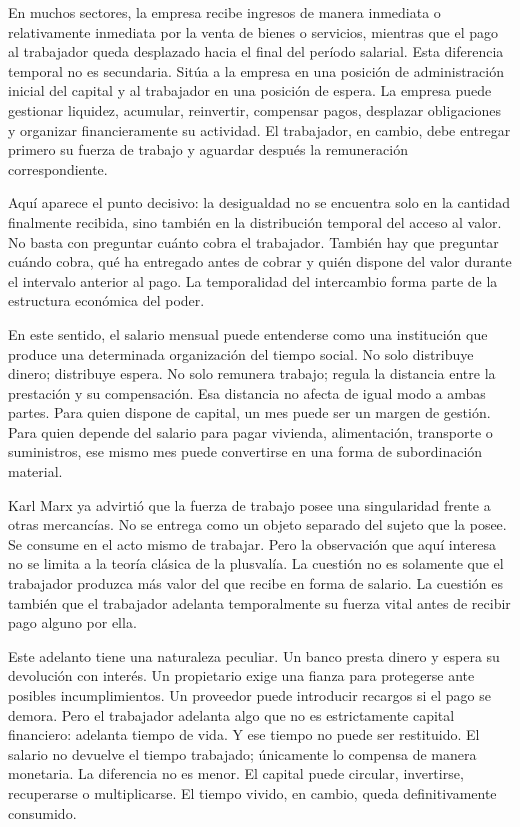 \documentclass[12pt,a4paper]{article}
\begin{document}
En muchos sectores, la empresa recibe ingresos de manera inmediata o relativamente inmediata por la venta de bienes o servicios, mientras que el pago al trabajador queda desplazado hacia el final del período salarial. Esta diferencia temporal no es secundaria. Sitúa a la empresa en una posición de administración inicial del capital y al trabajador en una posición de espera. La empresa puede gestionar liquidez, acumular, reinvertir, compensar pagos, desplazar obligaciones y organizar financieramente su actividad. El trabajador, en cambio, debe entregar primero su fuerza de trabajo y aguardar después la remuneración correspondiente.

Aquí aparece el punto decisivo: la desigualdad no se encuentra solo en la cantidad finalmente recibida, sino también en la distribución temporal del acceso al valor. No basta con preguntar cuánto cobra el trabajador. También hay que preguntar cuándo cobra, qué ha entregado antes de cobrar y quién dispone del valor durante el intervalo anterior al pago. La temporalidad del intercambio forma parte de la estructura económica del poder.

En este sentido, el salario mensual puede entenderse como una institución que produce una determinada organización del tiempo social. No solo distribuye dinero; distribuye espera. No solo remunera trabajo; regula la distancia entre la prestación y su compensación. Esa distancia no afecta de igual modo a ambas partes. Para quien dispone de capital, un mes puede ser un margen de gestión. Para quien depende del salario para pagar vivienda, alimentación, transporte o suministros, ese mismo mes puede convertirse en una forma de subordinación material.

Karl Marx ya advirtió que la fuerza de trabajo posee una singularidad frente a otras mercancías. No se entrega como un objeto separado del sujeto que la posee. Se consume en el acto mismo de trabajar. Pero la observación que aquí interesa no se limita a la teoría clásica de la plusvalía. La cuestión no es solamente que el trabajador produzca más valor del que recibe en forma de salario. La cuestión es también que el trabajador adelanta temporalmente su fuerza vital antes de recibir pago alguno por ella.

Este adelanto tiene una naturaleza peculiar. Un banco presta dinero y espera su devolución con interés. Un propietario exige una fianza para protegerse ante posibles incumplimientos. Un proveedor puede introducir recargos si el pago se demora. Pero el trabajador adelanta algo que no es estrictamente capital financiero: adelanta tiempo de vida. Y ese tiempo no puede ser restituido. El salario no devuelve el tiempo trabajado; únicamente lo compensa de manera monetaria. La diferencia no es menor. El capital puede circular, invertirse, recuperarse o multiplicarse. El tiempo vivido, en cambio, queda definitivamente consumido.
\end{document}
